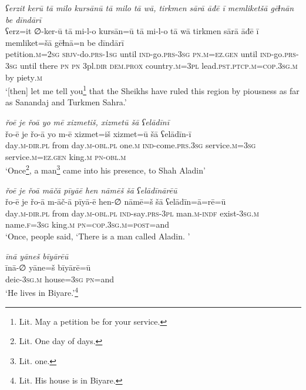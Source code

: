 \ea \label{DG.10}
\textit{ʕerzit kerū tā milo kursānū tā milo tā wā, tirkmen sārā āđē ī memliketšā gēɫnān be dīndārī} \\ 
\gll ʕerz=it ∅-ker-ū tā mi-l-o kursān=ū tā mi-l-o tā wā tirkmen sārā āđē ī memliket=šā gēɫnā=n be dīndārī \\ 
 petition\textsc{.m}\textsc{=\textsc{2sg}} \textsc{sbjv-}do\textsc{.prs}\textsc{-1sg} until \textsc{ind-}go\textsc{.prs}\textsc{-3sg} \textsc{pn}\textsc{.m}\textsc{=ez}\textsc{.gen} until \textsc{ind-}go\textsc{.prs}\textsc{-3sg} until there \textsc{pn} \textsc{pn} 3pl\textsc{.dir} \textsc{dem.prox} country\textsc{.m}\textsc{=3pl} lead\textsc{.pst}\textsc{.ptcp}\textsc{.m}\textsc{=cop}\textsc{.3sg}\textsc{.m} by piety\textsc{.m} \\ 
\glt `[then] let me tell you\footnote{Lit. May a petition be for your service.} that the Sheikhs have ruled this region by piousness as far as Sanandaj and Turkmen Sahra.'
\z 
 
\ea \label{DG.11}
\textit{řoē je řoā yo mē xizmetiš, xizmetū šā ʕelādīnī} \\ 
\gll řo-ē je řo-ā yo m-ē xizmet=iš xizmet=ū šā ʕelādīn-ī \\ 
 day\textsc{.m}\textsc{-dir}\textsc{.pl} from day\textsc{.m}\textsc{-obl}\textsc{.pl} one\textsc{.m} \textsc{ind-}come\textsc{.prs}\textsc{.3sg} service\textsc{.m}\textsc{=3sg} service\textsc{.m}\textsc{=ez}\textsc{.gen} king\textsc{.m} \textsc{pn}\textsc{-obl}\textsc{.m} \\ 
\glt `Once\footnote{Lit. One day of days.}, a man\footnote{Lit. one.}  came into his presence, to Shah Aladin'
\z 
 
\ea \label{DG.24}
\textit{řoē je řoā māčā pīyāē hen nāmēš šā ʕelādīnārēū} \\ 
\gll řo-ē je řo-ā m-āč-ā pīyā-ē hen-∅ nāmē=š šā ʕelādīn=ā=rē=ū \\ 
 day\textsc{.m}\textsc{-dir}\textsc{.pl} from day\textsc{.m}\textsc{-obl}\textsc{.pl} \textsc{ind-}say\textsc{.prs}\textsc{-3pl} man\textsc{.m}\textsc{-indf} exist\textsc{-3sg}\textsc{.m} name\textsc{\textsc{.f}}\textsc{=3sg} king\textsc{.m} \textsc{pn}\textsc{=cop}\textsc{.3sg}\textsc{.m}\textsc{=\textsc{post}}=and \\ 
\glt `Once, people said, ‘There is a man called Aladin. '
\z 
 
\ea \label{DG.25}
\textit{īnā yāneš bīyārēū} \\ 
\gll īnā-∅ yāne=š bīyārē=ū \\ 
 deic\textsc{-3sg}\textsc{.m} house\textsc{=3sg} \textsc{pn}=and \\ 
\glt `He lives in Biyare.'\footnote{Lit. His house is in Biyare.}
\z 
 
